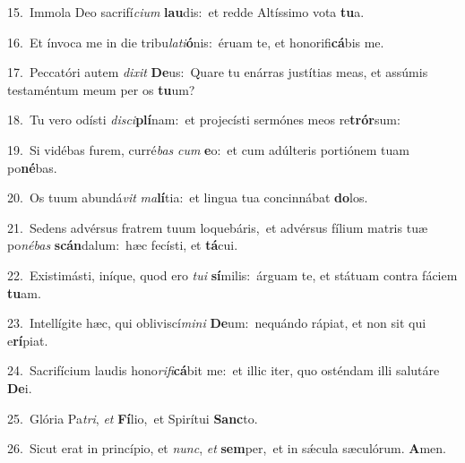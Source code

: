 {\numbfont\textcolor{\numbcolor}{15.}}~Immola Deo sacrifí\-\textit{ci}\-\textit{um} \textbf{lau}\-dis:~\star et redde Altíssimo vota \textbf{tu}\-a.\par
{\numbfont\textcolor{\numbcolor}{16.}}~Et ínvoca me in die tribu\-\textit{la}\-\textit{ti}\textbf{ó}nis:~\star éruam te, et honorifi\-\textbf{cá}\-bis me.\par
{\numbfont\textcolor{\numbcolor}{17.}}~Peccatóri autem \textit{di}\-\textit{xit} \textbf{De}\-us:~\star Quare tu enárras justítias meas, et assúmis testaméntum meum per os \textbf{tu}\-um?\par
{\numbfont\textcolor{\numbcolor}{18.}}~Tu vero odísti \textit{di}\-\textit{sci}\textbf{plí}nam:~\star et projecísti sermónes meos re\-\textbf{trór}\-sum:\par
{\numbfont\textcolor{\numbcolor}{19.}}~Si vidébas furem, curré\textit{bas} \textit{cum} \textbf{e}\-o:~\star et cum adúlteris portiónem tuam po\-\textbf{né}\-bas.\par
{\numbfont\textcolor{\numbcolor}{20.}}~Os tuum abundá\textit{vit} \textit{ma}\-\textbf{lí}tia:~\star et lingua tua concinnábat \textbf{do}\-los.\par
{\numbfont\textcolor{\numbcolor}{21.}}~Sedens advérsus fratrem tuum loquebáris,~\dagger et advérsus fílium matris tuæ po\-\textit{né}\-\textit{bas} \textbf{scán}\-dalum:~\star hæc fecísti, et \textbf{tá}\-cui.\par
{\numbfont\textcolor{\numbcolor}{22.}}~Existimásti, iníque, quod ero \textit{tu}\-\textit{i} \textbf{sí}\-milis:~\star árguam te, et státuam contra fáciem \textbf{tu}\-am.\par
{\numbfont\textcolor{\numbcolor}{23.}}~Intellígite hæc, qui obliviscí\-\textit{mi}\-\textit{ni} \textbf{De}\-um:~\star nequándo rápiat, et non sit qui e\-\textbf{rí}\-piat.\par
{\numbfont\textcolor{\numbcolor}{24.}}~Sacrifícium laudis hono\-\textit{ri}\-\textit{fi}\textbf{cá}bit me:~\star et illic iter, quo osténdam illi salutáre \textbf{De}\-i.\par
{\numbfont\textcolor{\numbcolor}{25.}}~Glória Pa\-\textit{tri}\-, \textit{et} \textbf{Fí}\-lio,~\star et Spirítui \textbf{Sanc}\-to.\par
{\numbfont\textcolor{\numbcolor}{26.}}~Sicut erat in princípio, et \textit{nunc}\-, \textit{et} \textbf{sem}\-per,~\star et in sǽcula sæculórum. \textbf{A}\-men.\par

